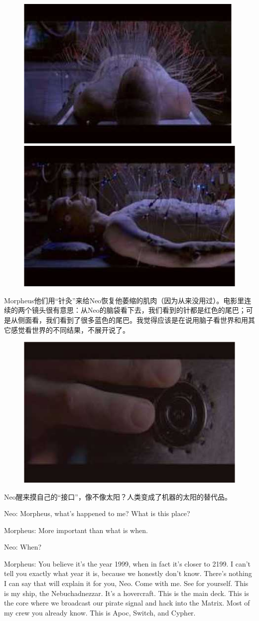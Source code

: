 \documentclass{ctexart}
\newenvironment{myquote}{\color{green} \setlength{\leftskip}{6em} \setlength{\rightskip}{4em} \setlength{\parindent}{-2em}}{\par}
\begin{document}
\begin{figure}[htb]
\centering
\includegraphics[width=0.45\linewidth]{fig/read_Matrix-24}
\includegraphics[width=0.45\linewidth]{fig/read_Matrix-25}
\end{figure}

Morpheus他们用“针灸”来给Neo恢复他萎缩的肌肉（因为从来没用过）。电影里连续的两个镜头很有意思：从Neo的脑袋看下去，我们看到的针都是红色的尾巴；可是从侧面看，我们看到了很多蓝色的尾巴。我觉得应该是在说用脑子看世界和用其它感觉看世界的不同结果，不展开说了。

\begin{figure}[htb]
\centering
\includegraphics[width=0.5\linewidth]{fig/read_Matrix-26}
\end{figure}

Neo醒来摸自己的“接口”，像不像太阳？人类变成了机器的太阳的替代品。

\begin{myquote}
Neo: Morpheus, what's happened to me? What is this place?

Morpheus: More important than what is when.

Neo: When?

Morpheus: You believe it's the year 1999, when in fact it's closer to 2199. I can't tell you exactly what year it is, because we honestly don't know. There's nothing I can say that will explain it for you, Neo. Come with me. See for yourself. This is my ship, the Nebuchadnezzar. It's a hovercraft. This is the main deck. This is the core where we broadcast our pirate signal and hack into the Matrix. Most of my crew you already know. This is Apoc, Switch, and Cypher.
\end{myquote}
\end{document}
